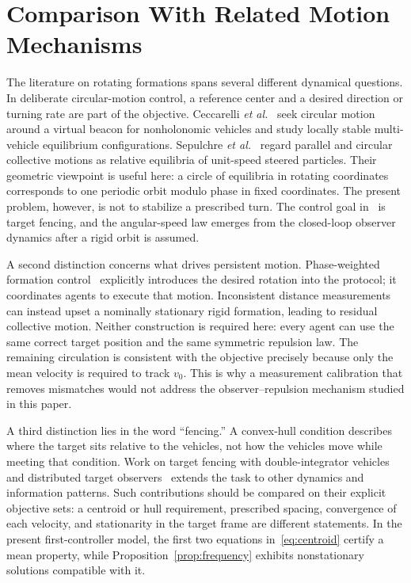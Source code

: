 \documentclass[conference]{IEEEtran}
\begin{document}
\section{Comparison With Related Motion Mechanisms}
\label{sec:comparison}
The literature on rotating formations spans several different dynamical questions. In deliberate circular-motion control, a reference center and a desired direction or turning rate are part of the objective. Ceccarelli \emph{et al.}~\cite{ceccarelli2008} seek circular motion around a virtual beacon for nonholonomic vehicles and study locally stable multi-vehicle equilibrium configurations. Sepulchre \emph{et al.}~\cite{sepulchre2007} regard parallel and circular collective motions as relative equilibria of unit-speed steered particles. Their geometric viewpoint is useful here: a circle of equilibria in rotating coordinates corresponds to one periodic orbit modulo phase in fixed coordinates. The present problem, however, is not to stabilize a prescribed turn. The control goal in~\cite{kou2022} is target fencing, and the angular-speed law emerges from the closed-loop observer dynamics after a rigid orbit is assumed.

A second distinction concerns what drives persistent motion. Phase-weighted formation control~\cite{lin2010} explicitly introduces the desired rotation into the protocol; it coordinates agents to execute that motion. Inconsistent distance measurements~\cite{garcia2015} can instead upset a nominally stationary rigid formation, leading to residual collective motion. Neither construction is required here: every agent can use the same correct target position and the same symmetric repulsion law. The remaining circulation is consistent with the objective precisely because only the mean velocity is required to track $v_0$. This is why a measurement calibration that removes mismatches would not address the observer--repulsion mechanism studied in this paper.

A third distinction lies in the word ``fencing.'' A convex-hull condition describes where the target sits relative to the vehicles, not how the vehicles move while meeting that condition. Work on target fencing with double-integrator vehicles and distributed target observers~\cite{pan2024} extends the task to other dynamics and information patterns. Such contributions should be compared on their explicit objective sets: a centroid or hull requirement, prescribed spacing, convergence of each velocity, and stationarity in the target frame are different statements. In the present first-controller model, the first two equations in~\eqref{eq:centroid} certify a mean property, while Proposition~\ref{prop:frequency} exhibits nonstationary solutions compatible with it.
\end{document}
